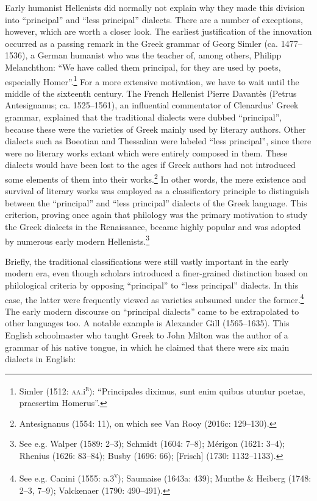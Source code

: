 \documentclass[12pt]{article}
\newenvironment{styleStandard}{\renewcommand\baselinestretch{1.25}\setlength\leftskip{0in}\setlength\rightskip{0in}\setlength\parindent{0.1972in}\setlength\parfillskip{0pt plus 1fil}\setlength\parskip{0in plus 1pt}\writerlistparindent\writerlistleftskip\leavevmode\normalfont\normalsize\writerlistlabel\ignorespaces}{\unskip\vspace{0in plus 1pt}\par}
\newcommand\writerlistleftskip{}
\newcommand\writerlistparindent{}
\newcommand\writerlistlabel{}
\begin{document}
\begin{styleStandard}
\end{styleStandard}

\begin{styleStandard}
Early humanist Hellenists did normally not explain why they made this division into “principal” and “less principal” dialects. There are a number of exceptions, however, which are worth a closer look. The earliest justification of the innovation occurred as a passing remark in the Greek grammar of Georg Simler (ca. 1477–1536), a German humanist who was the teacher of, among others, Philipp Melanchthon: “We have called them principal, for they are used by poets, especially Homer”.\footnote{ Simler (1512: \textsc{aa.}i\textsc{\textsuperscript{r}}): “Principales diximus, sunt enim quibus utuntur poetae, praesertim Homerus”.} For a more extensive motivation, we have to wait until the middle of the sixteenth century. The French Hellenist Pierre Davantès (Petrus Antesignanus; ca. 1525–1561), an influential commentator of Clenardus’ Greek grammar, explained that the traditional dialects were dubbed “principal”, because these were the varieties of Greek mainly used by literary authors. Other dialects such as Boeotian and Thessalian were labeled “less principal”, since there were no literary works extant which were entirely composed in them. These dialects would have been lost to the ages if Greek authors had not introduced some elements of them into their works.\footnote{ Antesignanus (1554: 11), on which see Van Rooy (2016c: 129–130).} In other words, the mere existence and survival of literary works was employed as a classificatory principle to distinguish between the “principal” and “less principal” dialects of the Greek language. This criterion, proving once again that philology was the primary motivation to study the Greek dialects in the Renaissance, became highly popular and was adopted by numerous early modern Hellenists.\footnote{ See e.g. Walper (1589: 2–3); Schmidt (1604: 7–8); Mérigon (1621: 3–4); Rhenius (1626: 83–84); Busby (1696: 66); [Frisch] (1730: 1132–1133).}
\end{styleStandard}

\begin{styleStandard}
Briefly, the traditional classifications were still vastly important in the early modern era, even though scholars introduced a finer-grained distinction based on philological criteria by opposing “principal” to “less principal” dialects. In this case, the latter were frequently viewed as varieties subsumed under the former.\footnote{ See e.g. Canini (1555: a.3\textsc{\textsuperscript{v}}); Saumaise (1643a: 439); Munthe \& Heiberg (1748: 2–3, 7–9); Valckenaer (1790: 490–491).} The early modern discourse on “principal dialects” came to be extrapolated to other languages too. A notable example is Alexander Gill (1565–1635). This English schoolmaster who taught Greek to John Milton was the author of a grammar of his native tongue, in which he claimed that there were six main dialects in English:
\end{styleStandard}
\end{document}

